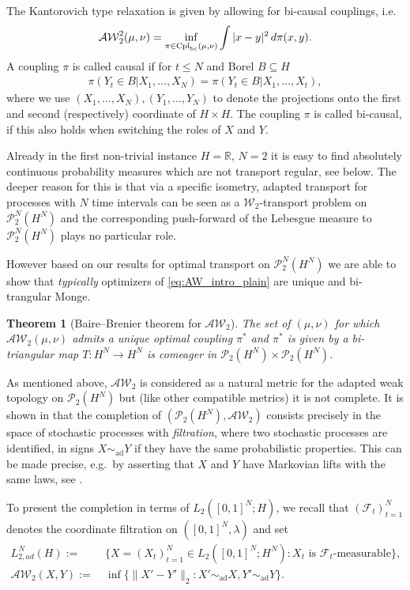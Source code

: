 \documentclass[a4paper]{amsart}
\newtheorem{theorem}{Theorem}
\numberwithin{theorem}{section}
\theoremstyle{definition}
\newcommand{\R}{\mathbb{R}}
\newcommand{\F}{\mathcal{F}}
\newcommand{\cpl}{\textup{Cpl}}
\newcommand{\W}{\mathcal{W}}
\newcommand{\AW}{\mathcal{AW}}
\newcommand{\Pc}{\mathcal P}
\newcommand{\cplbc}{\cpl_{\rm bc}}
\newcommand{\simad}{\sim_{\mathrm{ad}}}
\renewcommand{\H}{H}
\begin{document}
The Kantorovich type relaxation is given by allowing for bi-causal couplings, i.e.\ 
\begin{align}\label{eq:AW_intro_plain}
   \AW^2_2 (\mu, \nu) = \inf_{\pi \in \cplbc(\mu, \nu)} \int |x-y|^2  \, d\pi(x,y).     
\end{align}
 A coupling $\pi$  is called causal if for $t\leq N$ and Borel $B\subseteq H$
\begin{align}\label{eq:AWIntro}
    \pi(Y_t\in B| X_1, \ldots, X_N) = \pi(Y_t\in B| X_1, \ldots, X_t),  
\end{align}
where we use $(X_1,\ldots, X_N), (Y_1, \ldots, Y_N)$ to denote the projections onto the first and second (respectively) coordinate of $H\times H$. The coupling $\pi$ is called bi-causal, if this also holds when switching the roles of $X $ and $Y$.

Already in the first non-trivial instance  $H=\R$, $N=2$ it is easy to find absolutely continuous probability measures which are not transport regular, see  below. The deeper reason for this  is that via a specific isometry, adapted transport for processes with $N$ time intervals can be seen as a $\W_2$-transport problem on $\Pc_2^{N}(H^N)$ and the corresponding push-forward of the Lebesgue measure to   $\Pc_2^{N}(H^N)$ plays no particular role. 

However based on our results for optimal transport on $\Pc_2^{N}(H^N)$ we are able  to show that  \emph{typically} optimizers of \eqref{eq:AW_intro_plain} are unique and bi-trangular Monge.
\begin{theorem}[Baire--Brenier theorem for $\AW_2$]\label{thm:adaptedBaireBrenier}
    The set of $(\mu,\nu)$ for which $\AW_2(\mu, \nu)$ admits a unique optimal coupling $\pi^*$ and $\pi^*$ is given by a bi-triangular map $T: H^N\to H^N$ is comeager in  $\Pc_2(H^N)\times \Pc_2(H^N)$. 
\end{theorem}
As mentioned above, $\AW_2$ is considered as a natural metric for the adapted weak topology on $\Pc_2(H^N)$ but (like other compatible metrics) it is not  complete.
It is shown in \cite{BaBePa21} that the completion of $(\Pc_2(H^N),\AW_2)$ consists precisely in the space of stochastic processes with \emph{filtration}, where two stochastic processes are identified, in signs $X \simad Y$ if they have the same probabilistic properties. This can be made precise, e.g.\ by asserting that $X$ and $Y$ have Markovian lifts with the same laws, see \cite{BePfSc24}.


To present the completion in terms of $L_2([0,1]^N; H)$, we recall that $(\F_t)_{t=1}^N$ denotes the coordinate filtration on $([0,1]^N,\lambda)$ and set 
\begin{align*}
    L_{2,ad}^N(\H)  := & \  \{ X=(X_t)_{t=1}^N \in L_2([0,1]^N; \H^N ) : X_t \text{ is $\F_t$-measurable}  \}, \\
    \AW_2(X,Y):= & \ \inf \{ \| X'-Y'\|_2 : X'\simad X,Y'\simad Y\}. 
\end{align*}
\end{document}
